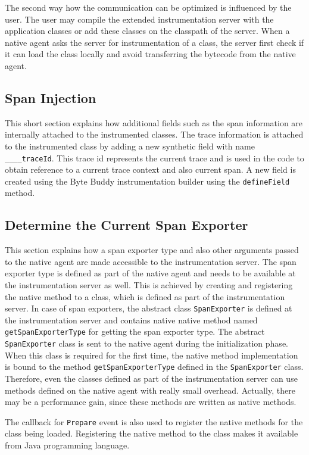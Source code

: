 The second way how the communication can be optimized is influenced by the user. The user may compile the extended instrumentation server with the application classes or add these classes on the classpath of the server. When a native agent asks the server for instrumentation of a class, the server first check if it can load the class locally and avoid transferring the bytecode from the native agent. 


\subsection{Span Injection}
This short section explains how additional fields such as the span information are internally attached to the instrumented classes. The trace information is attached to the instrumented class by adding a new synthetic field with name \texttt{\_\_\_\_traceId}. This trace id represents the current trace and is used in the code to obtain reference to a current trace context and also current span.  A new field is created using the Byte Buddy instrumentation builder using the \texttt{defineField} method.
\subsection{Determine the Current Span Exporter}
This section explains how a span exporter type and also other arguments passed to the native agent are made accessible to the instrumentation server. The span exporter type is defined as part of the native agent and needs to be available at the instrumentation server as well. This is achieved by creating and registering the native method to a class, which is defined as part of the instrumentation server.
In case of span exporters, the abstract class \texttt{SpanExporter} is defined at the instrumentation server and contains native native method named \texttt{getSpanExporterType} for getting the span exporter type. The abstract \linebreak \texttt{SpanExporter} class is sent to the native agent during the initialization phase. When this class is required for the first time, the native method implementation is bound to the method \texttt{getSpanExporterType} defined in the \texttt{SpanExporter} class. Therefore, even the classes defined as part of the instrumentation server can use methods defined on the native agent with really small overhead. Actually, there may be a performance gain, since these methods are written as native methods.

The callback for \texttt{Prepare} event is also used to register the native methods for the class being loaded. Registering the native method to the class makes it available from Java programming language.

